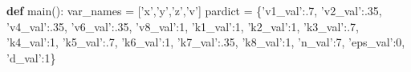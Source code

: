 \documentclass[
  english,
  a4paper,
  oneside]{article}
\newenvironment{Shaded}{}{}
\newcommand{\DecValTok}[1]{\textcolor[rgb]{0.25,0.63,0.44}{#1}}
\newcommand{\KeywordTok}[1]{\textcolor[rgb]{0.00,0.44,0.13}{\textbf{#1}}}
\newcommand{\NormalTok}[1]{#1}
\newcommand{\OperatorTok}[1]{\textcolor[rgb]{0.40,0.40,0.40}{#1}}
\newcommand{\StringTok}[1]{\textcolor[rgb]{0.25,0.44,0.63}{#1}}
\begin{document}
\begin{Shaded}
\begin{Highlighting}[]
\KeywordTok{def}\NormalTok{ main():}
\NormalTok{    var_names }\OperatorTok{=}\NormalTok{ [}\StringTok{'x'}\NormalTok{,}\StringTok{'y'}\NormalTok{,}\StringTok{'z'}\NormalTok{,}\StringTok{'v'}\NormalTok{]}
\NormalTok{    pardict }\OperatorTok{=}\NormalTok{ \{}\StringTok{'v1_val'}\NormalTok{:.}\DecValTok{7}\NormalTok{,}
               \StringTok{'v2_val'}\NormalTok{:.}\DecValTok{35}\NormalTok{,}
               \StringTok{'v4_val'}\NormalTok{:.}\DecValTok{35}\NormalTok{,}
               \StringTok{'v6_val'}\NormalTok{:.}\DecValTok{35}\NormalTok{,}
               \StringTok{'v8_val'}\NormalTok{:}\DecValTok{1}\NormalTok{,}
               \StringTok{'k1_val'}\NormalTok{:}\DecValTok{1}\NormalTok{,}
               \StringTok{'k2_val'}\NormalTok{:}\DecValTok{1}\NormalTok{,}
               \StringTok{'k3_val'}\NormalTok{:.}\DecValTok{7}\NormalTok{,}
               \StringTok{'k4_val'}\NormalTok{:}\DecValTok{1}\NormalTok{,}
               \StringTok{'k5_val'}\NormalTok{:.}\DecValTok{7}\NormalTok{,}
               \StringTok{'k6_val'}\NormalTok{:}\DecValTok{1}\NormalTok{,}
               \StringTok{'k7_val'}\NormalTok{:.}\DecValTok{35}\NormalTok{,}
               \StringTok{'k8_val'}\NormalTok{:}\DecValTok{1}\NormalTok{,}
               \StringTok{'n_val'}\NormalTok{:}\DecValTok{7}\NormalTok{,}
               \StringTok{'eps_val'}\NormalTok{:}\DecValTok{0}\NormalTok{,}
               \StringTok{'d_val'}\NormalTok{:}\DecValTok{1}\NormalTok{\}}
               

\end{Highlighting}
\end{Shaded}
\end{document}
